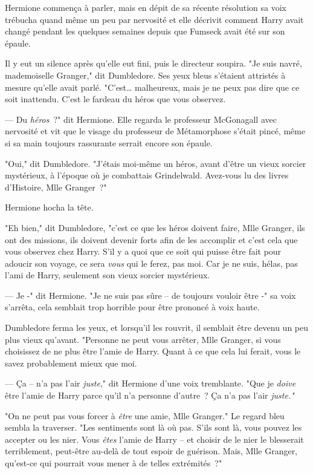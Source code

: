 Hermione commença à parler, mais en dépit de sa récente résolution sa voix trébucha quand même un peu par nervosité et elle décrivit comment Harry avait changé pendant les quelques semaines depuis que Fumseck avait été sur son épaule.

Il y eut un silence après qu'elle eut fini, puis le directeur soupira. "Je suis navré, mademoiselle Granger," dit Dumbledore. Ses yeux bleus s'étaient attristés à mesure qu'elle avait parlé. "C'est… malheureux, mais je ne peux pas dire que ce soit inattendu. C'est le fardeau du héros que vous observez.

--- Du \emph{héros}~?" dit Hermione. Elle regarda le professeur McGonagall avec nervosité et vit que le visage du professeur de Métamorphose s'était pincé, même si sa main toujours rassurante serrait encore son épaule.

"Oui," dit Dumbledore. "J'étais moi-même un héros, avant d'être un vieux sorcier mystérieux, à l'époque où je combattais Grindelwald. Avez-vous lu des livres d'Histoire, Mlle Granger~?"

Hermione hocha la tête.

"Eh bien," dit Dumbledore, "c'est ce que les héros doivent faire, Mlle Granger, ils ont des missions, ils doivent devenir forts afin de les accomplir et c'est cela que vous observez chez Harry. S'il y a quoi que ce soit qui puisse être fait pour adoucir son voyage, ce sera \emph{vous} qui le ferez, pas moi. Car je ne suis, hélas, pas l'ami de Harry, seulement son vieux sorcier mystérieux.

--- Je -" dit Hermione. "Je ne suis pas sûre -- de toujours vouloir être -" sa voix s'arrêta, cela semblait trop horrible pour être prononcé à voix haute.

Dumbledore ferma les yeux, et lorsqu'il les rouvrit, il semblait être devenu un peu plus vieux qu'avant. "Personne ne peut vous arrêter, Mlle Granger, si vous choisissez de ne plus être l'amie de Harry. Quant à ce que cela lui ferait, vous le savez probablement mieux que moi.

--- Ça -- n'a pas l'air \emph{juste}," dit Hermione d'une voix tremblante. "Que je \emph{doive} être l'amie de Harry parce qu'il n'a personne d'autre~? Ça n'a pas l'air \emph{juste."}

"On ne peut pas vous forcer à \emph{être} une amie, Mlle Granger." Le regard bleu sembla la traverser. "Les sentiments sont là où pas. S'ils sont là, vous pouvez les accepter ou les nier. Vous \emph{êtes} l'amie de Harry -- et choisir de le nier le blesserait terriblement, peut-être au-delà de tout espoir de guérison. Mais, Mlle Granger, qu'est-ce qui pourrait vous mener à de telles extrémités~?"

